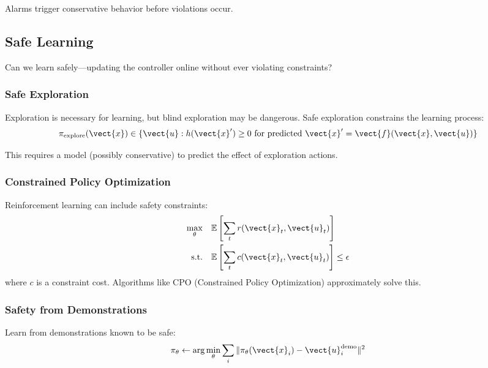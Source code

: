 Alarms trigger conservative behavior before violations occur.

\subsection{Safe Learning}

Can we learn safely---updating the controller online without ever violating constraints?

\subsubsection{Safe Exploration}

Exploration is necessary for learning, but blind exploration may be dangerous. Safe exploration constrains the learning process:
\begin{equation}
\pi_{\text{explore}}(\vect{x}) \in \{\vect{u} : h(\vect{x}') \geq 0 \text{ for predicted } \vect{x}' = \vect{f}(\vect{x}, \vect{u})\}
\label{eq:safe_exploration}
\end{equation}

This requires a model (possibly conservative) to predict the effect of exploration actions.

\subsubsection{Constrained Policy Optimization}

Reinforcement learning can include safety constraints:
\begin{align}
\max_\theta \quad & \mathbb{E}\left[\sum_t r(\vect{x}_t, \vect{u}_t)\right] \\
\text{s.t.} \quad & \mathbb{E}\left[\sum_t c(\vect{x}_t, \vect{u}_t)\right] \leq \epsilon
\end{align}
where $c$ is a constraint cost. Algorithms like CPO (Constrained Policy Optimization) approximately solve this.

\subsubsection{Safety from Demonstrations}

Learn from demonstrations known to be safe:
\begin{equation}
\pi_\theta \gets \arg\min_\theta \sum_{i} \|\pi_\theta(\vect{x}_i) - \vect{u}_i^{\text{demo}}\|^2
\label{eq:imitation_learning}
\end{equation}

